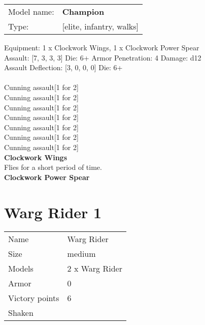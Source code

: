 \begin{tabular}{ll}
Model name: & {\bf Champion } \\
Type: & [elite, infantry, walks] \\
\end{tabular}

Equipment: 1 x Clockwork Wings, 1 x Clockwork Power Spear \\

Assault: [7, 3, 3, 3] Die: 6+ Armor Penetration: 4 Damage: d12 \\
Assault Deflection: [3, 0, 0, 0] Die: 6+\\
\\ 
Cunning assault[1 for 2]\\ 
Cunning assault[1 for 2]\\ 
Cunning assault[1 for 2]\\ 
Cunning assault[1 for 2]\\ 
Cunning assault[1 for 2]\\ 
Cunning assault[1 for 2]\\ 
Cunning assault[1 for 2]\\ 
 



{\bf Clockwork Wings } \\

Flies for a short period of time.\\ 





{\bf Clockwork Power Spear } \\






 















\clearpage

\section{ Warg Rider 1 }

\begin{tabular}{ll}
  Name & Warg Rider \\
  Size & medium\\
  Models & 2 x Warg Rider\\
  Armor & 0\\
  Victory points & 6\\
  Shaken & \\
\end{tabular}

